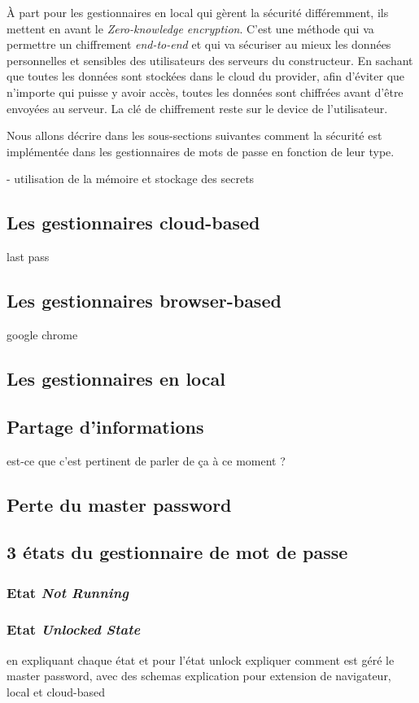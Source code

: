 À part pour les gestionnaires en local qui gèrent la sécurité différemment, ils mettent en avant le \textit{Zero-knowledge encryption}. C'est une méthode qui va permettre un chiffrement \textit{end-to-end} et qui va sécuriser au mieux les données personnelles et sensibles des utilisateurs des serveurs du constructeur. En sachant que toutes les données sont stockées dans le cloud du provider, afin d'éviter que n'importe qui puisse y avoir accès, toutes les données sont chiffrées avant d'être envoyées au serveur. La clé de chiffrement reste sur le device de l'utilisateur.

Nous allons décrire dans les sous-sections suivantes comment la sécurité est implémentée dans les gestionnaires de mots de passe en fonction de leur type. 

- utilisation de la mémoire et stockage des secrets
\subsection{Les gestionnaires cloud-based}
last pass
\subsection{Les gestionnaires browser-based}
google chrome
\subsection{Les gestionnaires en local}
\subsection{Partage d'informations}
est-ce que c'est pertinent de parler de ça à ce moment ?
\subsection{Perte du master password}
\subsection{3 états du gestionnaire de mot de passe}

\subsubsection{Etat \textit{Not Running}}
\subsubsection{Etat \textit{Unlocked State}}
en expliquant chaque état et pour l'état unlock expliquer comment est géré le master password, avec des schemas
explication pour extension de navigateur, local et cloud-based
